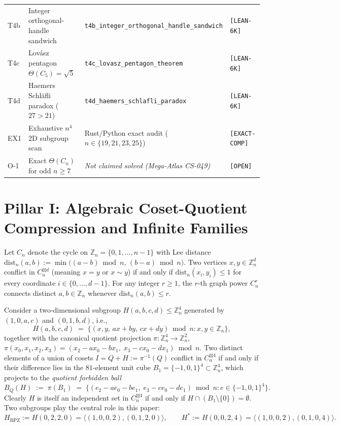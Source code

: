 \documentclass[11pt,reqno]{amsart}
\theoremstyle{definition}
\newcommand{\Z}{\mathbb{Z}}
\newcommand{\sprod}{\boxtimes}
\newcommand{\Hbpz}{H_{\mathrm{BPZ}}}
\newcommand{\Hstar}{H^*}
\newcommand{\dist}{\mathrm{dist}_n}
\newcommand{\lean}[1]{\nolinkurl{#1}}
\begin{document}
\begin{table}[t]
\begin{tabular}{@{}llll@{}}
T4b & Integer orthogonal-handle sandwich & \lean{t4b_integer_orthogonal_handle_sandwich} & \texttt{[LEAN-6K]} \\
T4c & Lovász pentagon $\Theta(C_5)=\sqrt{5}$ & \lean{t4c_lovasz_pentagon_theorem} & \texttt{[LEAN-6K]} \\
T4d & Haemers Schläfli paradox ($27>21$) & \lean{t4d_haemers_schlafli_paradox} & \texttt{[LEAN-6K]} \\
\addlinespace[2pt]
EX1 & Exhaustive $n^4$ 2D subgroup scan & Rust/Python exact audit ($n\in\{19,21,23,25\}$) & \texttt{[EXACT-COMP]} \\
O-1 & Exact $\Theta(C_n)$ for odd $n \ge 7$ & \emph{Not claimed solved (Mega-Atlas CS-049)} & \texttt{[OPEN]} \\
\bottomrule
\end{tabular}
\end{table}

\section{Pillar I: Algebraic Coset-Quotient Compression and Infinite Families}\label{sec:pillar1}

Let $C_n$ denote the cycle on $\Z_n = \{0,1,\dots,n-1\}$ with Lee distance
$\dist(a,b) := \min\bigl((a-b)\bmod n,\,(b-a)\bmod n\bigr)$.
Two vertices $x,y \in \Z_n^d$ conflict in $C_n^{\sprod d}$ (meaning $x=y$ or $x \sim y$) if and only if
$\dist(x_i,y_i) \le 1$ for every coordinate $i \in \{0,\dots,d-1\}$.
For any integer $r \ge 1$, the $r$-th graph power $C_n^r$ connects distinct $a,b \in \Z_n$ whenever $\dist(a,b)\le r$.

Consider a two-dimensional subgroup $H(a,b,c,d) \le \Z_n^4$ generated by
$(1,0,a,c)$ and $(0,1,b,d)$, i.e.,
\[
  H(a,b,c,d) \;=\; \bigl\{(x,y,\,ax+by,\,cx+dy) \bmod n : x,y \in \Z_n\bigr\},
\]
together with the canonical quotient projection $\pi : \Z_n^4 \to \Z_n^2$,
$\pi(x_0,x_1,x_2,x_3) = (x_2 - a x_0 - b x_1,\; x_3 - c x_0 - d x_1) \bmod n$.
Two distinct elements of a union of cosets $I = Q + H := \pi^{-1}(Q)$ conflict in $C_n^{\sprod 4}$ if and only if their difference lies in the $81$-element unit cube $B_1 = \{-1,0,1\}^4 \subset \Z_n^4$, which projects to the \emph{quotient forbidden ball}
\[
  B_Q(H) \;:=\; \pi(B_1) \;=\; \bigl\{(e_2 - a e_0 - b e_1,\; e_3 - c e_0 - d e_1) \bmod n : e \in \{-1,0,1\}^4\bigr\}.
\]
Clearly $H$ is itself an independent set in $C_n^{\sprod 4}$ if and only if $H \cap (B_1 \setminus \{0\}) = \emptyset$. Two subgroups play the central role in this paper:
\[
  \Hbpz := H(0,2,2,0) = \langle(1,0,0,2),(0,1,2,0)\rangle,
  \qquad
  \Hstar := H(0,0,2,4) = \langle(1,0,0,2),(0,1,0,4)\rangle.
\]
\end{document}
